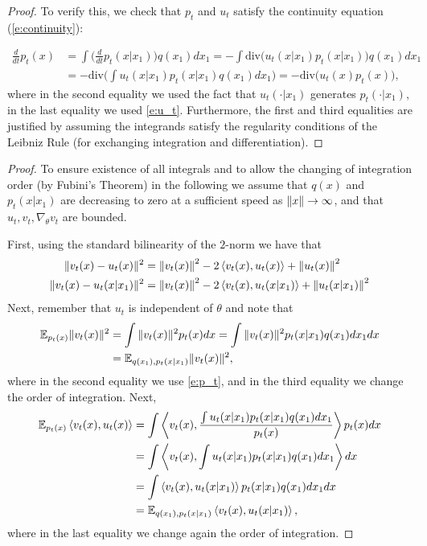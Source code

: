 \documentclass{article}
\begin{document}
\marginalvf*
\begin{proof}
To verify this, we check that $p_t$ and $u_t$ satisfy the continuity equation (\eqref{e:continuity}):

\begin{align*}
    \frac{d}{dt}p_t(x) &= \int \Big( \frac{d}{dt} p_t(x\vert x_1)  \Big) q(x_1) dx_1 = -\int \mathrm{div}\Big(   u_t(x\vert x_1)p_t(x\vert x_1)  \Big) q(x_1) dx_1 \\
    &= -\mathrm{div}\Big(\int    u_t(x\vert x_1)p_t(x\vert x_1)   q(x_1) dx_1\Big) = -\mathrm{div} \Big( u_t(x) p_t(x) \Big ),
\end{align*}
where in the second equality we used the fact that $u_t(\cdot\vert x_1)$ generates $p_t(\cdot\vert x_1)$, in the last equality we used \eqref{e:u_t}. Furthermore, the first and third equalities are justified by assuming the integrands satisfy the regularity conditions of the Leibniz Rule (for exchanging integration and differentiation).
\end{proof}

\cfm*
\begin{proof}
To ensure existence of all integrals and to allow the changing of integration order (by Fubini's Theorem) in the following we assume that $q(x)$ and $p_t(x|x_1)$ are decreasing to zero at a sufficient speed as $\left\Vert x\right\Vert\rightarrow \infty$, and that $u_t,v_t,\nabla_\theta v_t$ are bounded.

First, using the standard bilinearity of the $2$-norm we have that 
\begin{align*}
    \|v_t(x)-u_t(x)\|^2 &= \left\Vert v_t(x)\right\Vert^2 - 2\left \langle v_t(x),u_t(x) \right \rangle + \left\Vert u_t(x)\right\Vert^2 \\
    \|v_t(x)-u_t(x\vert x_1)\|^2  &= \left\Vert v_t(x)\right\Vert^2 - 2\left \langle v_t(x),u_t(x\vert x_1) \right \rangle + \left\Vert u_t(x\vert x_1)\right\Vert^2
\end{align*}
Next, remember that $u_t$ is independent of $\theta$ and note that 
\begin{align*}
    \mathbb{E}_{p_t(x)} \|v_t(x)\|^2 &= \int \|v_t(x)\|^2 p_t(x) dx = \int \|v_t(x)\|^2 p_t(x\vert x_1)q(x_1) dx_1 dx \\ &= \mathbb{E}_{q(x_1),p_t(x\vert x_1)}\|v_t(x)\|^2,
\end{align*}
where in the second equality we use \eqref{e:p_t}, and in the third equality we change the order of integration.  
Next,
\begin{align*}
    \mathbb{E}_{p_t(x)}\left \langle v_t(x),u_t(x) \right \rangle &= \int\left \langle v_t(x),\frac{\int u_t(x\vert x_1) p_t(x\vert x_1)q(x_1)dx_1}{p_t(x)} \right \rangle p_t(x)dx \\
    &=
    \int\left \langle v_t(x),\int u_t(x\vert x_1) p_t(x\vert x_1)q(x_1)dx_1 \right \rangle dx \\
    &= 
    \int\left \langle v_t(x), u_t(x\vert x_1)  \right \rangle p_t(x\vert x_1)q(x_1)dx_1dx \\
    &= \mathbb{E}_{q(x_1),p_t(x\vert x_1)} \left \langle v_t(x), u_t(x\vert x_1)  \right \rangle,
\end{align*}
where in the last equality we change again the order of integration. 
\end{proof}
\end{document}
